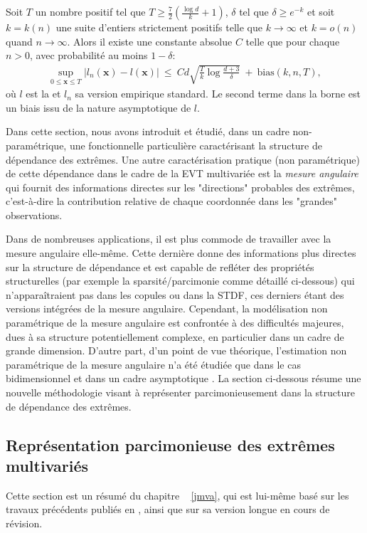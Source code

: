 \begin{theorem}
\label{resume_fr:thm:l}
Soit $T$ un nombre positif tel que $T \ge \frac{7}{2}(\frac{\log d}{k} + 1)$, $\delta$ tel que $\delta \ge e^{-k}$ et soit $k=k(n)$ une suite d'entiers strictement positifs telle que $k \to \infty$ et $k=o(n)$ quand $n \to \infty$. 
Alors il existe une constante absolue $ C $ telle que pour chaque $ n> 0 $, avec probabilité au moins $ 1- \delta $:
\begin{align*}
\sup_{0 \le \mathbf{x} \le T} \left| l_n(\mathbf{x}) - l(\mathbf{x}) \right| ~\le~ Cd\sqrt{\frac{T}{k}\log\frac{d+3}{\delta}} ~+~
\text{bias}(k, n, T),
\end{align*}
où $ l $ est la \stdf et $ l_n $ sa version empirique standard. Le second terme dans la borne est un biais issu de la nature asymptotique de $ l $.
\end{theorem}


Dans cette section, nous avons introduit et étudié, dans un cadre non-paramétrique, une fonctionnelle particulière caractérisant la structure de dépendance des extrêmes.
%
Une autre caractérisation pratique (non paramétrique) de cette dépendance dans le cadre de la EVT multivariée est la \textit{mesure angulaire} qui fournit des informations directes sur les "directions" probables des extrêmes, c'est-à-dire la contribution relative de chaque coordonnée dans les "grandes" observations.

Dans de nombreuses applications, il est plus commode de travailler avec la mesure angulaire elle-même. Cette dernière donne des informations plus directes sur la structure de dépendance et est capable de refléter des propriétés structurelles (par exemple la sparsité/parcimonie comme détaillé ci-dessous) qui n'apparaîtraient pas dans les copules ou dans la STDF, ces derniers étant des versions intégrées de la mesure angulaire.
Cependant, la modélisation non paramétrique de la mesure angulaire est confrontée à des difficultés majeures, dues à sa structure potentiellement complexe, en particulier dans un cadre de grande dimension.
D'autre part, d'un point de vue théorique, l'estimation non paramétrique de la mesure angulaire n'a été étudiée que dans le cas bidimensionnel et dans un cadre asymptotique \cite{Einmahl2001, Einmahl2009}. La section ci-dessous résume une nouvelle méthodologie visant à représenter parcimonieusement dans la structure de dépendance des extrêmes.


\subsection{Représentation parcimonieuse des extrêmes multivariés}
\label{resume_fr:sec:JMVA}
Cette section est un résumé du chapitre ~ \ref {jmva}, qui est lui-même basé sur les travaux précédents publiés en \cite {AISTAT16}, ainsi que sur sa version longue \cite {ARXIV16} en cours de révision.

